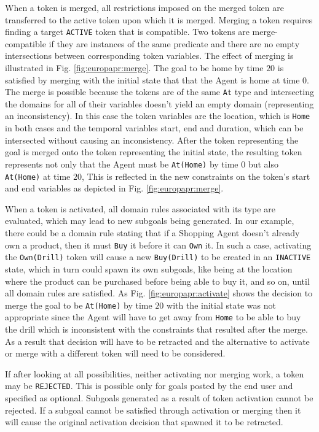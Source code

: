 \begin{description}
\begin{enumerate}
\end{enumerate}

When a token is merged, all restrictions imposed on the merged token
are transferred to the active token upon which it is merged. Merging a
token requires finding a target \texttt{ACTIVE} token that is
compatible. Two tokens are merge-compatible if they are instances of
the same predicate and there are no empty intersections between
corresponding token variables.  The effect of merging is illustrated
in Fig. \ref{fig:europapr:merge}. The goal to be home by time $20$ is
satisfied by merging with the initial state that 
that the Agent is home at time $0$.  The merge is possible because the
tokens are of the same \texttt{At} type and intersecting the domains
for all of their variables doesn't yield an empty domain (representing
an inconsistency). In this case the token variables are the location,
which is \texttt{Home} in both cases and the temporal variables start,
end and duration, which can be intersected without causing an
inconsistency. After the token representing the goal is merged onto
the token representing the initial state, the resulting token
represents not only that the Agent must be \texttt{At(Home)} by time
$0$ but also \texttt{At(Home)} at time $20$, This is reflected in the
new constraints on the token's start and end variables as depicted in
Fig. \ref{fig:europapr:merge}.

When a token is activated, all domain rules associated with its type
are evaluated, which may lead to new subgoals being generated. In our
example, there could be a domain rule stating that if a Shopping Agent
doesn't already own a product, then it must \texttt{Buy} it before it
can \texttt{Own} it. In such a case, activating the
\texttt{Own(Drill)} token will cause a new \texttt{Buy(Drill)} to be
created in an \texttt{INACTIVE} state, which in turn could spawn its
own subgoals, like being at the location where the product can be
purchased before being able to buy it, and so on, until all domain
rules are satisfied. As Fig. \ref{fig:europapr:activate} shows the
decision to merge the goal to be \texttt{At(Home)} by time $20$ with
the initial state was not appropriate since the Agent will have to get
away from \texttt{Home} to be able to buy the drill which is
inconsistent with the constraints that resulted after the merge. As a
result that decision will have to be retracted and the alternative to
activate or merge with a different token will need to be considered.

If after looking at all possibilities, neither activating nor merging
work, a token may be \texttt{REJECTED}. This is possible only for
goals posted by the end user and specified as optional. Subgoals
generated as a result of token activation cannot be rejected. If a
subgoal cannot be satisfied through activation or merging then it will
cause the original activation decision that spawned it to be
retracted.


\end{description}

